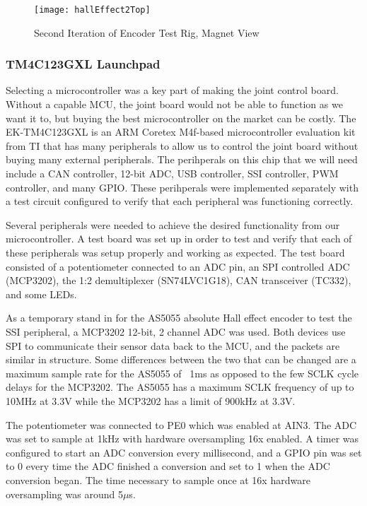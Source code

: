 \begin{figure}[H]
	\centering
	\texttt{[image: hallEffect2Top]}
	\caption{Second Iteration of Encoder Test Rig, Magnet View}
	\label{fig:Second Iteration of Encoder Test Rig, Magnet View}
\end{figure}

\subsubsection{TM4C123GXL Launchpad}
Selecting a microcontroller was a key part of making the joint control board. Without a capable MCU, the joint board would not be able to function as we want it to, but buying the best microcontroller on the market can be costly. The EK-TM4C123GXL is an ARM Coretex M4f-based microcontroller evaluation kit from TI that has many peripherals to allow us to control the joint board without buying many external peripherals. The perihperals on this chip that we will need include a CAN controller, 12-bit ADC, USB controller, SSI controller, PWM controller, and many GPIO. These perihperals were implemented separately with a test circuit configured to verify that each peripheral was functioning correctly.

\noindent Several peripherals were needed to achieve the desired functionality from our microcontroller. A test board was set up in order to test and verify that each of these peripherals was setup properly and working as expected. The test board consisted of a potentiometer connected to an ADC pin, an SPI controlled ADC (MCP3202), the 1:2 demultiplexer (SN74LVC1G18), CAN transceiver (TC332), and some LEDs.

\noindent As a temporary stand in for the AS5055 absolute Hall effect encoder to test the SSI peripheral, a MCP3202 12-bit, 2 channel ADC was used. Both devices use SPI to communicate their sensor data back to the MCU, and the packets are similar in structure. Some differences between the two that can be changed are a maximum sample rate for the AS5055 of ~1ms as opposed to the few SCLK cycle delays for the MCP3202. The AS5055 has a maximum SCLK frequency of up to 10MHz at 3.3V while the MCP3202 has a limit of 900kHz at 3.3V. 

\noindent The potentiometer was connected to PE0 which was enabled at AIN3. The ADC was set to sample at 1kHz with hardware oversampling 16x enabled. A timer was configured to start an ADC conversion every millisecond, and a GPIO pin was set to 0 every time the ADC finished a conversion and set to 1 when the ADC conversion began. The time necessary to sample once at 16x hardware oversampling was around 5$\mu$s.


